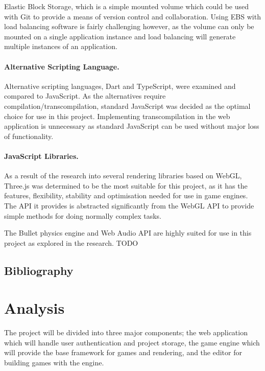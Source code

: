 \documentclass[a4paper, 12pt]{article}
\begin{document}
Elastic Block Storage, which is a simple mounted volume which could be used with Git to provide a means of version control and collaboration. Using EBS with load balancing software is fairly challenging however, as the volume can only be mounted on a single application instance and load balancing will generate multiple instances of an application.

\paragraph{Alternative Scripting Language.}
Alternative scripting languages, Dart and TypeScript, were examined and compared to JavaScript. As the alternatives require compilation/transcompilation, standard JavaScript was decided as the optimal choice for use in this project. Implementing transcompilation in the web application is unnecessary as standard JavaScript can be used without major loss of functionality.

\paragraph{JavaScript Libraries.}
As a result of the research into several rendering libraries based on WebGL, Three.js was determined to be the most suitable for this project, as it has the features, flexibility, stability and optimisation needed for use in game engines. The API it provides is abstracted significantly from the WebGL API to provide simple methods for doing normally complex tasks.

The Bullet physics engine and Web Audio API are highly suited for use in this project as explored in the research. TODO

\subsection{Bibliography}

\begingroup
	\def\section*#1{}
	{}
	
\endgroup

\section{Analysis}

The project will be divided into three major components; the web application which will handle user authentication and project storage, the game engine which will provide the base framework for games and rendering, and the editor for building games with the engine.
\end{document}
